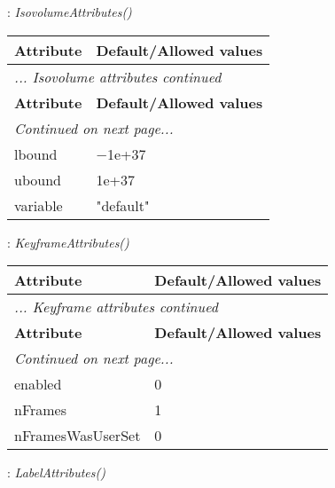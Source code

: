 \documentclass[10pt,a4paper]{report}
\begin{document}
\newpage

{}
: {\it IsovolumeAttributes() }\\[-3mm]

\begin{longtable}{ll}
{\bf Attribute} & {\bf Default/Allowed values} \\
\hline \hline
\endfirsthead
\multicolumn{2}{l}{{\it ... Isovolume attributes continued}} \\
{\bf Attribute} & {\bf Default/Allowed values} \\
\hline \hline
\endhead
\hline
\multicolumn{2}{l}{{\it Continued on next page...}} \\
\endfoot
\hline
\endlastfoot

lbound  &  $-$1e+37 \\
ubound  &  1e+37 \\
variable  &  "default" \\
\end{longtable}

\newpage

{}
: {\it KeyframeAttributes() }\\[-3mm]

\begin{longtable}{ll}
{\bf Attribute} & {\bf Default/Allowed values} \\
\hline \hline
\endfirsthead
\multicolumn{2}{l}{{\it ... Keyframe attributes continued}} \\
{\bf Attribute} & {\bf Default/Allowed values} \\
\hline \hline
\endhead
\hline
\multicolumn{2}{l}{{\it Continued on next page...}} \\
\endfoot
\hline
\endlastfoot

enabled  &  0 \\
nFrames  &  1 \\
nFramesWasUserSet  &  0 \\
\end{longtable}

\newpage

{}
: {\it LabelAttributes() }\\[-3mm]
\end{document}
